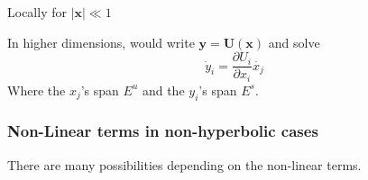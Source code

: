 \documentclass{article}
\begin{document}
Locally for $|\bm{x}| \ll 1$ \\
\begin{center}
\end{center}
In higher dimensions, would write $\bm{y} = \bm{U}(\bm{x})$ and solve
\[ \dot{y}_i = \frac{\partial U_i}{\partial x_i} \dot{x_j} \]
Where the $x_j$'s span $E^u$ and the $y_i$'s span $E^s$.
\subsubsection{Non-Linear terms in non-hyperbolic cases}
There are many possibilities depending on the non-linear terms.
\end{document}
